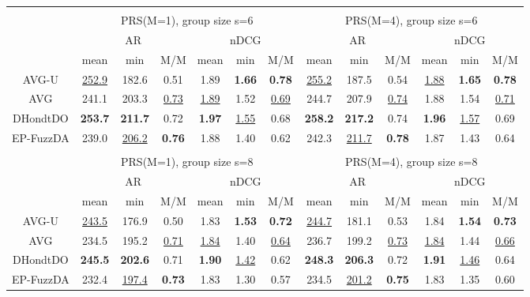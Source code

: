 \begin{tabular}{ c | c c c | c c c || c c c | c c c }
\multicolumn{12}{c}{} \\
\multicolumn{1}{c}{} & \multicolumn{6}{c}{PRS(M=1), group size s=6} & \multicolumn{6}{c}{PRS(M=4), group size s=6} \\
\multicolumn{1}{c}{} & \multicolumn{3}{c}{AR} & \multicolumn{3}{c}{nDCG} & \multicolumn{3}{c}{AR} & \multicolumn{3}{c}{nDCG} \\
& mean & min & M/M & mean & min & M/M & mean & min & M/M & mean & min & M/M \\
\hline
AVG-U & \underline{252.9} & 182.6 & 0.51 & 1.89 & \textbf{1.66} & \textbf{0.78} & \underline{255.2} & 187.5 & 0.54 & \underline{1.88} & \textbf{1.65} & \textbf{0.78} \\
AVG & 241.1 & 203.3 & \underline{0.73} & \underline{1.89} & 1.52 & \underline{0.69} & 244.7 & 207.9 & \underline{0.74} & 1.88 & 1.54 & \underline{0.71} \\
DHondtDO & \textbf{253.7} & \textbf{211.7} & 0.72 & \textbf{1.97} & \underline{1.55} & 0.68 & \textbf{258.2} & \textbf{217.2} & 0.74 & \textbf{1.96} & \underline{1.57} & 0.69 \\
EP-FuzzDA & 239.0 & \underline{206.2} & \textbf{0.76} & 1.88 & 1.40 & 0.62 & 242.3 & \underline{211.7} & \textbf{0.78} & 1.87 & 1.43 & 0.64 \\

\multicolumn{12}{c}{} \\
\multicolumn{1}{c}{} & \multicolumn{6}{c}{PRS(M=1), group size s=8} & \multicolumn{6}{c}{PRS(M=4), group size s=8} \\
\multicolumn{1}{c}{} & \multicolumn{3}{c}{AR} & \multicolumn{3}{c}{nDCG} & \multicolumn{3}{c}{AR} & \multicolumn{3}{c}{nDCG} \\
& mean & min & M/M & mean & min & M/M & mean & min & M/M & mean & min & M/M \\
\hline
AVG-U & \underline{243.5} & 176.9 & 0.50 & 1.83 & \textbf{1.53} & \textbf{0.72} & \underline{244.7} & 181.1 & 0.53 & 1.84 & \textbf{1.54} & \textbf{0.73} \\
AVG & 234.5 & 195.2 & \underline{0.71} & \underline{1.84} & 1.40 & \underline{0.64} & 236.7 & 199.2 & \underline{0.73} & \underline{1.84} & 1.44 & \underline{0.66} \\
DHondtDO & \textbf{245.5} & \textbf{202.6} & 0.71 & \textbf{1.90} & \underline{1.42} & 0.62 & \textbf{248.3} & \textbf{206.3} & 0.72 & \textbf{1.91} & \underline{1.46} & 0.64 \\
EP-FuzzDA & 232.4 & \underline{197.4} & \textbf{0.73} & 1.83 & 1.30 & 0.57 & 234.5 & \underline{201.2} & \textbf{0.75} & 1.83 & 1.35 & 0.60 \\

\end{tabular}
